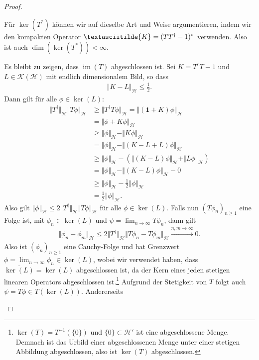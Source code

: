 \documentclass[11pt, hidelinks]{article}
\newcommand{\h}{\mathcal{H}}
\newcommand{\im}{\operatorname{im}}
\numberwithin{conj}{section}
\begin{document}
\begin{proof}
\begin{itemize}
    Für $\ker(T^\ast)$ können wir auf dieselbe Art und Weise argumentieren, indem wir den kompakten Operator $\textasciitilde{K} = (TT^\dagger -1)^\ast$ verwenden. Also ist auch $\dim(\ker(T^\ast)) < \infty$.

    Es bleibt zu zeigen, dass $\im(T)$ abgeschlossen ist. Sei $K = T^\dagger T - 1$ und $L \in \mathcal{K}(\h)$ mit endlich dimensionalem Bild, so dass
    \begin{align}
        \Vert K-L \Vert_\h \leq \frac{1}{2}.
    \end{align}
    Dann gilt für alle $\phi \in \ker(L)$:
    \begin{align}
        \Vert T^\dagger \Vert_\h \Vert T\phi \Vert_\h &\geq \Vert T^\dagger T \phi \Vert_\h = \Vert (\mathbf{1}+K)\phi \Vert_\h \nonumber\\
        &= \Vert \phi + K\phi \Vert_\h \nonumber\\
        &\geq \Vert \phi \Vert_\h - \Vert K \phi \Vert_\h \nonumber\\
        &= \Vert \phi \Vert_\h - \Vert (K-L+L) \phi \Vert_\h \nonumber\\
        &\geq \Vert \phi \Vert_\h - (\Vert (K-L) \phi \Vert_\h + \Vert L \phi \Vert_\h) \nonumber\\
        &= \Vert \phi \Vert_\h - \Vert (K-L)\phi \Vert_\h - 0 \nonumber\\
        &\geq \Vert \phi \Vert_\h - \frac{1}{2} \Vert \phi \Vert_\h \nonumber\\
        &= \frac{1}{2} \Vert \phi \Vert_\h.
    \end{align}
    Also gilt $\Vert \phi \Vert_\h \leq 2 \Vert T^\dagger \Vert_\h \Vert T\phi \Vert_\h$ für alle $\phi \in \ker(L)$. Falls nun $(T\phi_n)_{n \geq 1}$ eine Folge ist, mit $\phi_n \in \ker(L)$ und $\psi = \lim_{n \to \infty} T\phi_n$, dann gilt
    \begin{align}
        \Vert \phi_n - \phi_m \Vert_\h \leq 2 \Vert T^\dagger \Vert_\h \Vert T\phi_n - T\phi_m \Vert_\h \xrightarrow[]{n,m \to \infty} 0.
    \end{align}
    Also ist $(\phi_n)_{n \geq 1}$ eine Cauchy-Folge und hat Grenzwert $\phi = \lim_{n \to \infty} \phi_n \in \ker(L)$, wobei wir verwendet haben, dass $\overline{\ker(L)} = \ker(L)$ abgeschlossen ist, da der Kern eines jeden stetigen linearen Operators abgeschlossen ist.\footnote{$\ker(T) = T^{-1}(\{0\})$ und $\{0\} \subset \h'$ ist eine abgeschlossene Menge. Demnach ist das Urbild einer abgeschlossenen Menge unter einer stetigen Abbildung abgeschlossen, also ist $\ker(T)$ abgeschlossen.} Aufgrund der Stetigkeit von $T$ folgt auch $\psi = T\phi \in T(\ker(L))$. Andererseits

\end{itemize}
\end{proof}
\end{document}
